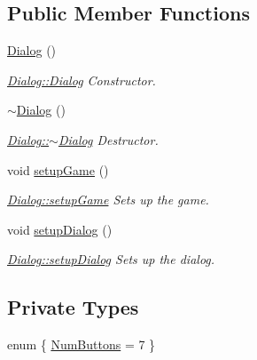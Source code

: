 \subsection*{Public Member Functions}
\begin{DoxyCompactItemize}
\item 
\hyperlink{class_dialog_a1f16fe034646a987e6de37396e40f674}{Dialog} ()
\begin{DoxyCompactList}\small\item\em \hyperlink{class_dialog_a1f16fe034646a987e6de37396e40f674}{Dialog\-::\-Dialog} Constructor. \end{DoxyCompactList}\item 
\hyperlink{class_dialog_a2a1fe6ef28513eed13bfcd3a4da83ccb}{$\sim$\-Dialog} ()
\begin{DoxyCompactList}\small\item\em \hyperlink{class_dialog_a2a1fe6ef28513eed13bfcd3a4da83ccb}{Dialog\-::$\sim$\-Dialog} Destructor. \end{DoxyCompactList}\item 
void \hyperlink{class_dialog_a4320f72d8354f94942348b74323a651e}{setup\-Game} ()
\begin{DoxyCompactList}\small\item\em \hyperlink{class_dialog_a4320f72d8354f94942348b74323a651e}{Dialog\-::setup\-Game} Sets up the game. \end{DoxyCompactList}\item 
void \hyperlink{class_dialog_a0c2de1df5e1defe8e39bf30afbd63840}{setup\-Dialog} ()
\begin{DoxyCompactList}\small\item\em \hyperlink{class_dialog_a0c2de1df5e1defe8e39bf30afbd63840}{Dialog\-::setup\-Dialog} Sets up the dialog. \end{DoxyCompactList}\end{DoxyCompactItemize}
\subsection*{Private Types}
\begin{DoxyCompactItemize}
\item 
enum \{ \hyperlink{class_dialog_aa450168d087018adecfc85aad9dc0758ad9cc094540b183d393105bd9b90bfd2c}{Num\-Buttons} = 7
 \}
\end{DoxyCompactItemize}
